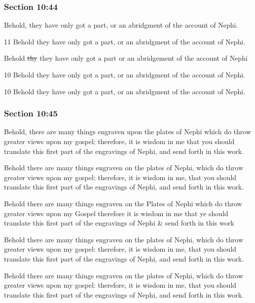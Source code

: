 	\subsubsection{Section 10:44} %
		\label{DC10-44}

		Behold, they have only got a part, or an abridgment of the account of Nephi.

		\begin{framed}
		\scriptsize
			\begin{compactdesc}
				\item[JSP] 11 Behold they have only got a part, or an abridgment of the account of Nephi.
				\item[RB1] Behold \sout{thy} they have only got a part or an abridgement of the account of Nephi
				\item[DC 1835] 10 Behold they have only got a part, or an abridgment of the account of Nephi.
				\item[DC 1844] 10 Behold they have only got a part, or an abridgment of the account of Nephi.
			\end{compactdesc}
		\end{framed}

	\subsubsection{Section 10:45} %
		\label{DC10-45}

		Behold, there are many things engraven upon the plates of Nephi which do throw greater views upon my gospel; therefore, it is wisdom in me that you should translate this first part of the engravings of Nephi, and send forth in this work.

		\begin{framed}
		\scriptsize
			\begin{compactdesc}
				\item[JSP] Behold there are many things engraven on the plates of Nephi, which do throw greater views upon my gospel: therefore, it is wisdom in me, that you should translate this first part of the engravings of Nephi, and send forth in this work.
				\item[RB1] Behold there are many things engraven on the Plates of Nephi which do throw greater views upon my Gospel therefore it is wisdom in me that ye should translate this first part of the engravings of Nephi \& send forth in this work
				\item[DC 1835] Behold there are many things engraven on the plates of Nephi, which do throw greater views upon my gospel: therefore, it is wisdom in me, that you should translate this first part of the engravings of Nephi, and send forth in this work.
				\item[DC 1844] Behold there are many things engraven on the plates of Nephi, which do throw greater views upon my gospel: therefore, it is wisdom in me, that you should translate this first part of the engravings of Nephi, and send forth in this work. 
			\end{compactdesc}
		\end{framed}

